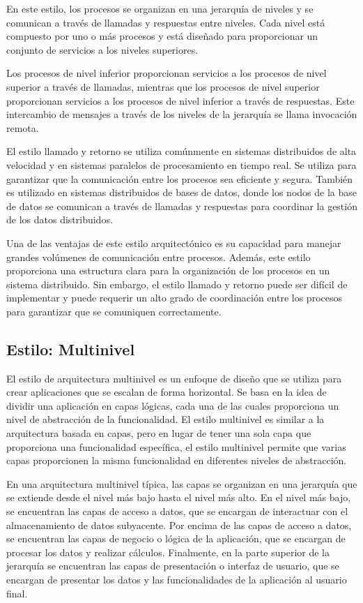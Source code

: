 \documentclass[executivepaper]{article}
\begin{document}
En este estilo, los procesos se organizan en una jerarquía de niveles y se comunican a través de llamadas y respuestas entre niveles. Cada nivel está compuesto por uno o más procesos y está diseñado para proporcionar un conjunto de servicios a los niveles superiores.

Los procesos de nivel inferior proporcionan servicios a los procesos de nivel superior a través de llamadas, mientras que los procesos de nivel superior proporcionan servicios a los procesos de nivel inferior a través de respuestas. Este intercambio de mensajes a través de los niveles de la jerarquía se llama invocación remota.

El estilo llamado y retorno se utiliza comúnmente en sistemas distribuidos de alta velocidad y en sistemas paralelos de procesamiento en tiempo real. Se utiliza para garantizar que la comunicación entre los procesos sea eficiente y segura. También es utilizado en sistemas distribuidos de bases de datos, donde los nodos de la base de datos se comunican a través de llamadas y respuestas para coordinar la gestión de los datos distribuidos.

Una de las ventajas de este estilo arquitectónico es su capacidad para manejar grandes volúmenes de comunicación entre procesos. Además, este estilo proporciona una estructura clara para la organización de los procesos en un sistema distribuido. Sin embargo, el estilo llamado y retorno puede ser difícil de implementar y puede requerir un alto grado de coordinación entre los procesos para garantizar que se comuniquen correctamente.

\subsection*{Estilo: Multinivel}
El estilo de arquitectura multinivel es un enfoque de diseño que se utiliza para crear aplicaciones que se escalan de forma horizontal. Se basa en la idea de dividir una aplicación en capas lógicas, cada una de las cuales proporciona un nivel de abstracción de la funcionalidad. El estilo multinivel es similar a la arquitectura basada en capas, pero en lugar de tener una sola capa que proporciona una funcionalidad específica, el estilo multinivel permite que varias capas proporcionen la misma funcionalidad en diferentes niveles de abstracción.

En una arquitectura multinivel típica, las capas se organizan en una jerarquía que se extiende desde el nivel más bajo hasta el nivel más alto. En el nivel más bajo, se encuentran las capas de acceso a datos, que se encargan de interactuar con el almacenamiento de datos subyacente. Por encima de las capas de acceso a datos, se encuentran las capas de negocio o lógica de la aplicación, que se encargan de procesar los datos y realizar cálculos. Finalmente, en la parte superior de la jerarquía se encuentran las capas de presentación o interfaz de usuario, que se encargan de presentar los datos y las funcionalidades de la aplicación al usuario final.
\end{document}

